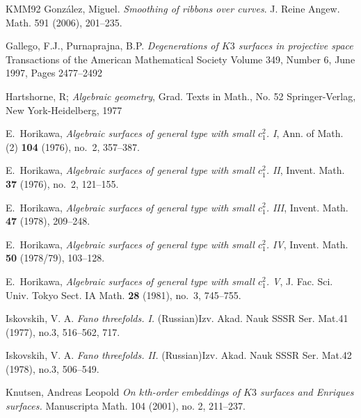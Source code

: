 \documentclass[11pt,twoside]{amsart}
\theoremstyle{plain}
\numberwithin{equation}{section}
\theoremstyle{definition}
\begin{document}
\begin{thebibliography}{KMM92}
  Gonz\'alez, Miguel.
  \emph{Smoothing of ribbons over curves}.
  J. Reine Angew. Math. 591 (2006), 201--235.

Gallego, F.J., Purnaprajna, B.P.
\emph{Degenerations of $K3$ surfaces in projective space}
Transactions of the American Mathematical Society
Volume 349, Number 6, June 1997, Pages 2477–2492



\color{black}


Hartshorne, R; \emph{Algebraic geometry}, 
Grad. Texts in Math., No. 52
Springer-Verlag, New York-Heidelberg, 1977

\color{black}

E.~Horikawa,
\emph{Algebraic surfaces of general type with small $c_1^2$. I},
Ann. of Math. (2) \textbf{104} (1976), no.~2, 357--387.

E.~Horikawa,
\emph{Algebraic surfaces of general type with small $c_1^2$. II},
Invent. Math. \textbf{37} (1976), no.~2, 121--155.

E.~Horikawa,
\emph{Algebraic surfaces of general type with small $c_1^2$. III},
Invent. Math. \textbf{47} (1978), 209--248.

E.~Horikawa,
\emph{Algebraic surfaces of general type with small $c_1^2$. IV},
Invent. Math. \textbf{50} (1978/79), 103--128.

E.~Horikawa,
\emph{Algebraic surfaces of general type with small $c_1^2$. V},
J. Fac. Sci. Univ. Tokyo Sect. IA Math. \textbf{28} (1981),
no.~3, 745--755.



Iskovskih, V. A.
\emph{Fano threefolds. I.}
(Russian)Izv. Akad. Nauk SSSR Ser. Mat.41 (1977), no.3, 516–562, 717.

Iskovskih, V. A.
\emph{Fano threefolds. II.}
(Russian)Izv. Akad. Nauk SSSR Ser. Mat.42 (1978), no.3, 506–549.



Knutsen, Andreas Leopold
\emph{On $k$th-order embeddings of $K3$ surfaces and Enriques surfaces.}
Manuscripta Math. 104 (2001), no. 2, 211–237.


\end{thebibliography}
\end{document}
